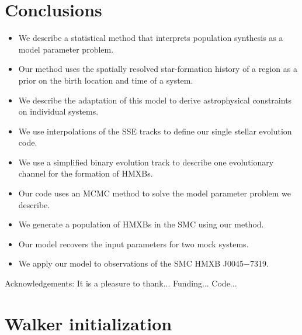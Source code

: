 \documentclass[usenatbib]{mnras}
\begin{document}
\section{Conclusions}

\begin{itemize}
\item We describe a statistical method that interprets population synthesis as a model parameter problem.\\
\item Our method uses the spatially resolved star-formation history of a region as a prior on the birth location and time of a system. \\
\item We describe the adaptation of this model to derive astrophysical constraints on individual systems. \\
\item We use interpolations of the SSE tracks to define our single stellar evolution code. \\
\item We use a simplified binary evolution track to describe one evolutionary channel for the formation of HMXBs. \\
\item Our code uses an MCMC method to solve the model parameter problem we describe. \\
\item We generate a population of HMXBs in the SMC using our method. \\
\item Our model recovers the input parameters for two mock systems. \\
\item We apply our model to observations of the SMC HMXB J0045$-$7319.
\end{itemize}





Acknowledgements:
It is a pleasure to thank...
Funding...
Code...



\appendix

\section{Walker initialization} \label{sec:initialize}
\end{document}
